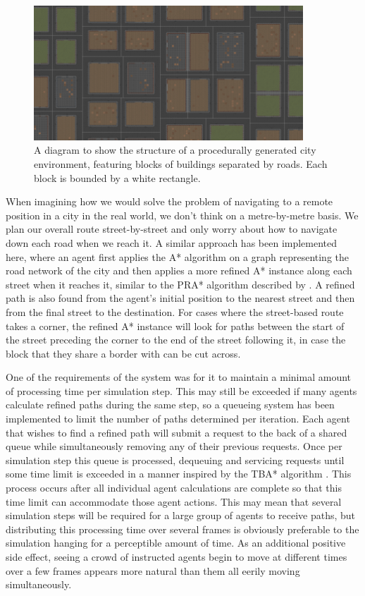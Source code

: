 \documentclass[a4paper,12pt]{article}
\begin{document}
\label{sec:paths}
\begin{figure}[h]
\centering
\includegraphics[width=0.9\textwidth]{blocks}
\caption{A diagram to show the structure of a procedurally generated city environment, featuring blocks of buildings separated by roads. Each block is bounded by a white rectangle.}
\label{fig:block}
\end{figure}

When imagining how we would solve the problem of navigating to a remote position in a city in the real world, we don't think on a metre-by-metre basis. We plan our overall route street-by-street and only worry about how to navigate down each road when we reach it. A similar approach has been implemented here, where an agent first applies the A* algorithm on a graph representing the road network of the city and then applies a more refined A* instance along each street when it reaches it, similar to the PRA* algorithm described by . A refined path is also found from the agent's initial position to the nearest street and then from the final street to the destination. For cases where the street-based route takes a corner, the refined A* instance will look for paths between the start of the street preceding the corner to the end of the street following it, in case the block that they share a border with can be cut across.

One of the requirements of the system was for it to maintain a minimal amount of processing time per simulation step. This may still be exceeded if many agents calculate refined paths during the same step, so a queueing system has been implemented to limit the number of paths determined per iteration. Each agent that wishes to find a refined path will submit a request to the back of a shared queue while simultaneously removing any of their previous requests. Once per simulation step this queue is processed, dequeuing and servicing requests until some time limit is exceeded in a manner inspired by the TBA* algorithm \cite{bulitko10}. This process occurs after all individual agent calculations are complete so that this time limit can accommodate those agent actions. This may mean that several simulation steps will be required for a large group of agents to receive paths, but distributing this processing time over several frames is obviously preferable to the simulation hanging for a perceptible amount of time. As an additional positive side effect, seeing a crowd of instructed agents begin to move at different times over a few frames appears more natural than them all eerily moving simultaneously.
\end{document}
